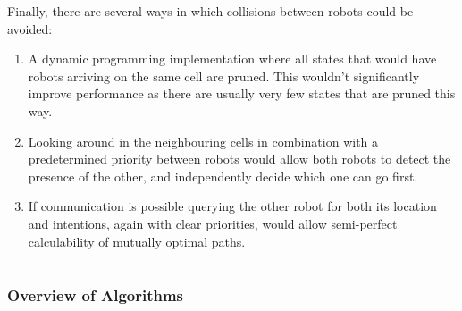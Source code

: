 \documentclass[10pt,a4paper]{article}
\begin{document}
Finally, there are several ways in which collisions between robots could be avoided:
\begin{enumerate}
	\item A dynamic programming implementation where all states that would have robots arriving on the same cell are pruned.
	This wouldn't significantly improve performance as there are usually very few states that are pruned this way.
	\item Looking around in the neighbouring cells in combination with a predetermined priority between robots would allow both robots to detect the presence of the other, and independently decide which one can go first.
	\item If communication is possible querying the other robot for both its location and intentions, again with clear priorities, would allow semi-perfect calculability of mutually optimal paths.
\end{enumerate}


\part{}


\section{Overview of Algorithms}
\end{document}
